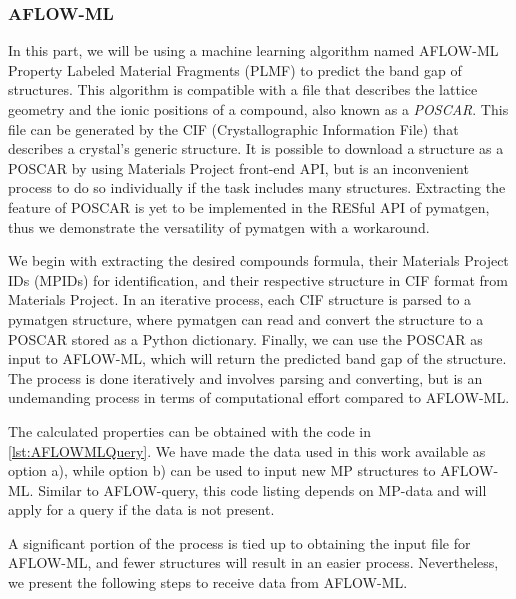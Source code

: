 \subsubsection{AFLOW-ML}

In this part, we will be using a machine learning algorithm named AFLOW-ML Property Labeled Material Fragments (PLMF) \cite{Isayev2017} to predict the band gap of structures. This algorithm is compatible with a file that describes the lattice geometry and the ionic positions of a compound, also known as a \textit{POSCAR}. This file can be generated by the CIF (Crystallographic Information File) that describes a crystal's generic structure. It is possible to download a structure as a POSCAR by using Materials Project front-end API, but is an inconvenient process to do so individually if the task includes many structures. Extracting the feature of POSCAR is yet to be implemented in the RESful API of pymatgen, thus we demonstrate the versatility of pymatgen with a workaround.

We begin with extracting the desired compounds formula, their Materials Project IDs (MPIDs) for identification, and their respective structure in CIF format from Materials Project. In an iterative process, each CIF structure is parsed to a pymatgen structure, where pymatgen can read and convert the structure to a POSCAR stored as a Python dictionary. Finally, we can use the POSCAR as input to AFLOW-ML, which will return the predicted band gap of the structure. The process is done iteratively and involves parsing and converting, but is an undemanding process in terms of computational effort compared to AFLOW-ML.



The calculated properties can be obtained with the code in \autoref{lst:AFLOWMLQuery}. We have made the data used in this work available as option a), while option b) can be used to input new MP structures to AFLOW-ML. Similar to AFLOW-query, this code listing depends on MP-data and will apply for a query if the data is not present.

A significant portion of the process is tied up to obtaining the input file for AFLOW-ML, and fewer structures will result in an easier process. Nevertheless, we present the following steps to receive data from AFLOW-ML.

